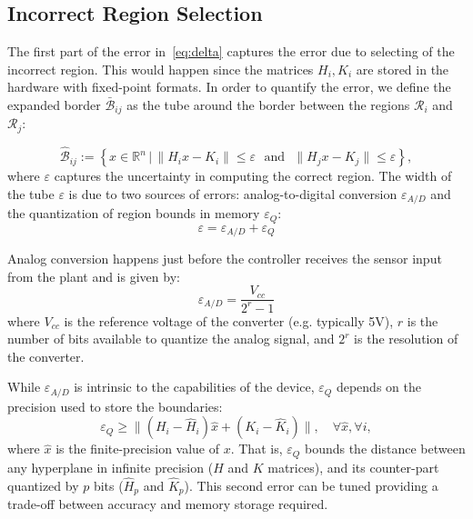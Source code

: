 \subsection{Incorrect Region Selection}

The first part of the error in~\autoref{eq:delta} captures the error due to
selecting of the incorrect region.
This would happen since the matrices $H_i,K_i$ are stored in the hardware with fixed-point formats. In order to quantify the error, we define the expanded border $\bar{\mathcal B}_{ij}$ as the tube around the border between the regions $\mathcal{R}_i$ and $\mathcal{R}_j$:

\begin{equation*}
\hat{\mathcal B}_{ij} := \left\{x\in\mathbb R^n\,|\, \| H_i x - K_i\| \le \varepsilon\,\, \text{ and }\,\, \| H_j x - K_j\| \le \varepsilon \right\},
\end{equation*}
where $\varepsilon$ captures the uncertainty in computing the correct region.
%
The width of the tube $\varepsilon$ is due to two sources of errors:
analog-to-digital conversion $\varepsilon_{A/D}$ and the quantization of region
bounds in memory $\varepsilon_{Q}$:
\begin{equation}\label{eq:epsilontot}
  \varepsilon=\varepsilon_{A/D}+\varepsilon_{Q}
\end{equation}

Analog conversion happens just before the controller receives the sensor input from the plant
and is given by:
\begin{equation*}
\varepsilon_{A/D}=\frac{V_{cc}}{2^{r}-1}
\end{equation*}
where $V_{cc}$ is the reference voltage of the converter (e.g. typically 5V), $r$
is the number of bits available to quantize the analog signal, and $2^{r}$ is
the resolution of the converter.

While $\varepsilon_{A/D}$ is intrinsic to the capabilities of the device,
$\varepsilon_{Q}$ depends on the precision used to store the boundaries:
\begin{equation}\label{eq:quantizationlines}
  \varepsilon_{Q} \ge  \|(H_i - \hat{H}_i) \hat{x} + (K_i - \hat{K}_i)\|, \quad \forall \hat{x},\forall i,
\end{equation}
where $\hat{x}$ is the finite-precision value of $x$.
That is, $\varepsilon_{Q}$ bounds the distance between any hyperplane in infinite
precision ($H$ and $K$ matrices), and its counter-part quantized by $p$ bits 
($\hat{H}_{p}$ and $\hat{K}_{p}$).
This second error can be tuned providing a trade-off between accuracy and
memory storage required.

